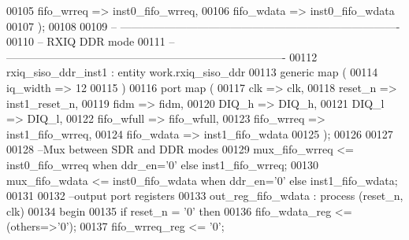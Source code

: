 \begin{DoxyCode}
00105       fifo_wrreq  => inst0_fifo_wrreq,
00106       fifo_wdata  => inst0_fifo_wdata
00107         \textcolor{vhdlchar}{)}; 
00108  
00109 \textcolor{keyword}{-- ----------------------------------------------------------------------------}
00110 \textcolor{keyword}{-- RXIQ DDR mode}
00111 \textcolor{keyword}{-- ---------------------------------------------------------------------------- }
00112   rxiq\_siso\_ddr\_inst1 : \textcolor{keywordflow}{entity} work.rxiq_siso_ddr
00113    \textcolor{keywordflow}{generic} \textcolor{keywordflow}{map} (
00114       iq_width    => \textcolor{vhdllogic}{12}
00115    \textcolor{vhdlchar}{)}
00116    \textcolor{keywordflow}{port} \textcolor{keywordflow}{map} (
00117       clk         => clk,
00118       reset_n     => inst1_reset_n,
00119       fidm         => fidm,
00120       DIQ_h         => DIQ_h,
00121         DIQ_l          => DIQ_l,
00122       fifo_wfull  => fifo_wfull,
00123       fifo_wrreq  => inst1_fifo_wrreq,
00124       fifo_wdata  => inst1_fifo_wdata
00125         \textcolor{vhdlchar}{)};
00126         
00127         
00128 \textcolor{keyword}{ --Mux between SDR and DDR modes       }
00129 \textcolor{vhdlchar}{mux_fifo_wrreq} \textcolor{vhdlchar}{<=} \textcolor{vhdlchar}{inst0_fifo_wrreq} \textcolor{keywordflow}{when} \textcolor{vhdlchar}{ddr_en}\textcolor{vhdlchar}{=}\textcolor{vhdlchar}{'}\textcolor{vhdllogic}{}\textcolor{vhdllogic}{0}\textcolor{vhdlchar}{'} \textcolor{keywordflow}{else} \textcolor{vhdlchar}{inst1_fifo_wrreq};
00130 \textcolor{vhdlchar}{mux_fifo_wdata} \textcolor{vhdlchar}{<=} \textcolor{vhdlchar}{inst0_fifo_wdata} \textcolor{keywordflow}{when} \textcolor{vhdlchar}{ddr_en}\textcolor{vhdlchar}{=}\textcolor{vhdlchar}{'}\textcolor{vhdllogic}{}\textcolor{vhdllogic}{0}\textcolor{vhdlchar}{'} \textcolor{keywordflow}{else} \textcolor{vhdlchar}{inst1_fifo_wdata}; 
00131 
00132 \textcolor{keyword}{--output port registers    }
00133 out\_reg\_fifo\_wdata : \textcolor{keywordflow}{process} (reset_n, clk)
00134 \textcolor{vhdlkeyword}{begin}
00135    \textcolor{keywordflow}{if} \textcolor{vhdlchar}{reset_n} \textcolor{vhdlchar}{=} \textcolor{vhdlchar}{'}\textcolor{vhdllogic}{}\textcolor{vhdllogic}{0}\textcolor{vhdlchar}{'} \textcolor{keywordflow}{then} 
00136       \textcolor{vhdlchar}{fifo_wdata_reg} \textcolor{vhdlchar}{<=} \textcolor{vhdlchar}{(}\textcolor{keywordflow}{others}\textcolor{vhdlchar}{=}\textcolor{vhdlchar}{>}\textcolor{vhdlchar}{'}\textcolor{vhdllogic}{}\textcolor{vhdllogic}{0}\textcolor{vhdlchar}{'}\textcolor{vhdlchar}{)};
00137       \textcolor{vhdlchar}{fifo_wrreq_reg} \textcolor{vhdlchar}{<=} \textcolor{vhdlchar}{'}\textcolor{vhdllogic}{}\textcolor{vhdllogic}{0}\textcolor{vhdlchar}{'};

\end{DoxyCode}
